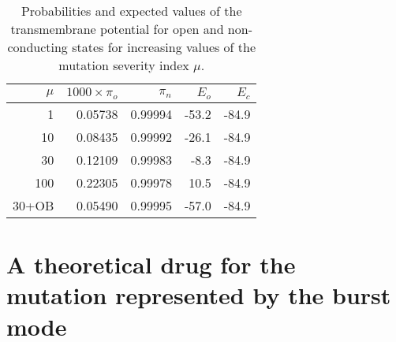 \begin{table}  \begin{center}
\begin{tabular}{|r|r|r|r|r|} \hline
$\mu$ & $1000 \times \pi_o$ & $\pi_n$ & $E_o$ & $E_c$ \\ \hline
1 & 0.05738 &  0.99994 & -53.2 & -84.9 \\ \hline
10 & 0.08435 & 0.99992 & -26.1 & -84.9 \\ \hline
30 & 0.12109 & 0.99983 & -8.3 & -84.9 \\ \hline
100 & 0.22305 & 0.99978 & 10.5 & -84.9 \\ \hline
30+OB & 0.05490&0.99995 & -57.0 & -84.9 \\ \hline
\end{tabular} \end{center}
\caption{Probabilities and expected values of the transmembrane potential for open and non-conducting states for increasing values of the mutation severity index $\mu$.} \label{tab:burst}
\end{table}





\section[Theoretical drug for the burst mode model]{A theoretical drug for the
mutation represented by the burst mode}


